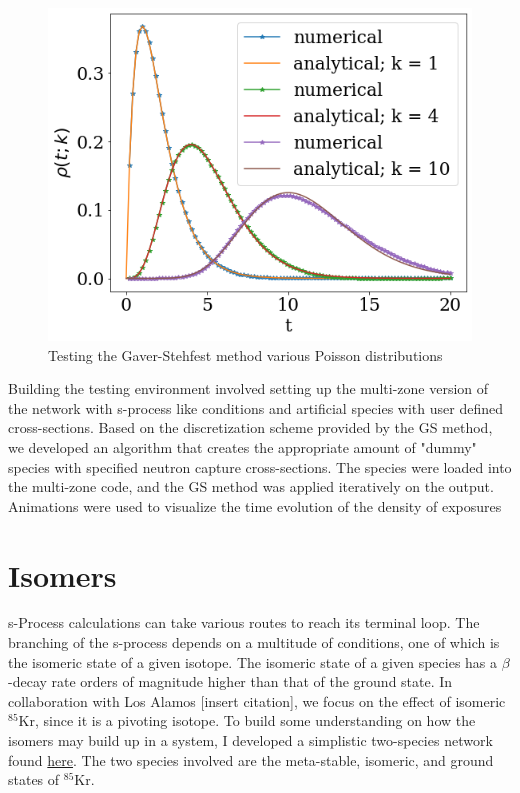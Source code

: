 \documentclass{article}
\begin{document}
\begin{figure}[!htp]
    \centerline{\includegraphics[scale = 0.5]{images/poisson_test.png}}
    \caption{Testing the Gaver-Stehfest method various Poisson distributions}
    \label{fig 3}
\end{figure}


Building the testing environment involved setting up the multi-zone version of the network with s-process like conditions and artificial 
species with user defined cross-sections. Based on the discretization scheme provided by the GS method, we developed an algorithm 
that creates the appropriate amount of "dummy" species with specified neutron capture cross-sections. The species were loaded into the 
multi-zone code, and the GS method was applied iteratively on the output. Animations were used to visualize the time 
evolution of the density of exposures 

\section*{Isomers}

s-Process calculations can take various routes to reach its terminal loop. The branching of the s-process depends on a multitude of 
conditions, one of which is the isomeric state of a given isotope. The isomeric state of a given species has a $\beta$-decay rate 
orders of magnitude higher than that of the ground state. In collaboration with Los Alamos [insert citation], we focus on the 
effect of isomeric $^{85}$Kr, since it is a pivoting isotope. To build some understanding on how the isomers may build up in a system, 
I developed a simplistic two-species network found \href{https://github.com/jaadt7/isomer_intuition}{here}.
The two species involved are the meta-stable, isomeric, and ground states of $^{85}$Kr.\\ 
\end{document}
